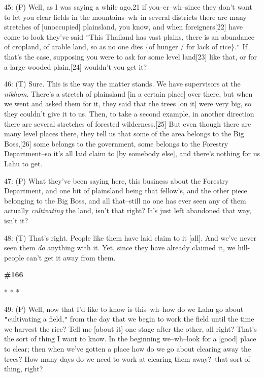 45: (P) Well, as I was saying a while ago,21 if you--er--wh--since they don't want
to let you clear fields in the mountains--wh--in several districts there are many
stretches of [unoccupied] plainsland, you know, and when foreigners[22] have come
to look they've said \texttt{"}This Thailand has vast plains, there is an abundance
of cropland, of arable land, so as no one dies \{of hunger / for lack of rice\}.\texttt{"}
If that's the case, supposing you were to ask for some level land[23] like that,
or for a large wooded plain,[24] wouldn't you get it?

46: (T) Sure. This is the way the matter stands. We have supervisors at the \textit{nikhom}.
There's a stretch of plainsland [in a certain place] over there, but when we went
and asked them for it, they said that the trees [on it] were very big, so they
couldn't give it to us. Then, to take a second example, in another direction there
are several stretches of forested wilderness.[25] But even though there are many
level places there, they tell us that some of the area belongs to the Big Boss,[26]
some belongs to the government, some belongs to the Forestry Department--so it's
all laid claim to [by somebody else], and there's nothing for us Lahu to get.

47: (P) What they've been saying here, this business about the Forestry Department,
and one bit of plainsland being that fellow's, and the other piece belonging to
the Big Boss, and all that--still no one has ever seen any of them actually \textit{cultivating}
the land, isn't that right? It's just left abandoned that way, isn't it?

48: (T) That's right. People like them have laid claim to it [all]. And we've never
seen them \textit{do }anything with it. Yet, since they have already claimed it,
we hill-people can't get it away from them.

\begin{center}
\textbf{\#166 }

* * *
\end{center}

\leftskip=0pt
49: (P) Well, now that I'd like to know is this--wh--how do we Lahu go about \texttt{"}cultivating
a field,\texttt{"} from the day that we begin to work the field until the time
we harvest the rice? Tell me [about it] one stage after the other, all right? That's
the sort of thing I want to know. In the beginning we--wh--look for a [good] place
to clear; then when we've gotten a place how do we go about clearing away the trees?
How many days do we need to work at clearing them away?--that sort of thing, right?

